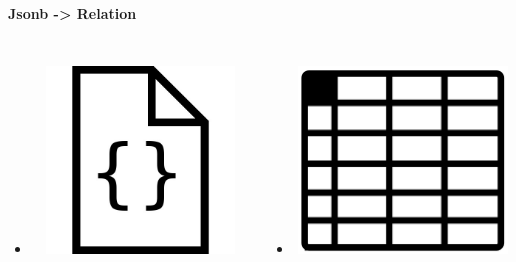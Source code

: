 \documentclass[usenames,dvipsnames, 18pt, compress, aspectratio=169]{beamer}
\begin{document}
\begin{frame}
    \frametitle{}
    \begin{center}
    \textbf{Jsonb -> Relation}

        \begin{columns}[T,onlytextwidth]
        \begin{itemize}[leftmargin=*]
            \item \includegraphics[width=6cm,height=5cm]{document.jpg}
        \end{itemize}

        \begin{itemize}[leftmargin=*]
            \item \includegraphics[width=6cm,height=5cm]{relation.png}
        \end{itemize}

        \end{columns}

    \end{center}
\end{frame}
\end{document}
